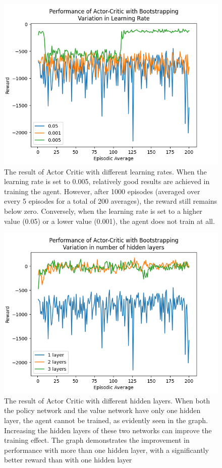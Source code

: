 \documentclass{article}
\begin{document}
\begin{figure}[htbp]
    \centering
\includegraphics[width=0.9\linewidth]{Report/images/Performance_of_Actor_Critic_BS_LR.png}
\caption{\label{fig:ActorCritic for different learning rates}The result of Actor Critic with different learning rates. When the learning rate is set to 0.005, relatively good results are achieved in training the agent. However, after 1000 episodes (averaged over every 5 episodes for a total of 200 averages), the reward still remains below zero. Conversely, when the learning rate is set to a higher value (0.05) or a lower value (0.001), the agent does not train at all.}
\end{figure}

\begin{figure}[htbp]
\centering
\includegraphics[width=0.9\linewidth]{Report/images/Performance_of_Actor_Critic_BS_Layers.png}
\caption{\label{fig:ActorCritic for different Hidden Layers}The result of Actor Critic with different hidden layers. When both the policy network and the value network have only one hidden layer, the agent cannot be trained, as evidently seen in the graph. Increasing the hidden layers of these two networks can improve the training effect. The graph demonstrates the improvement in performance with more than one hidden layer, with a significantly better reward than with one hidden layer}
\end{figure}
\end{document}
